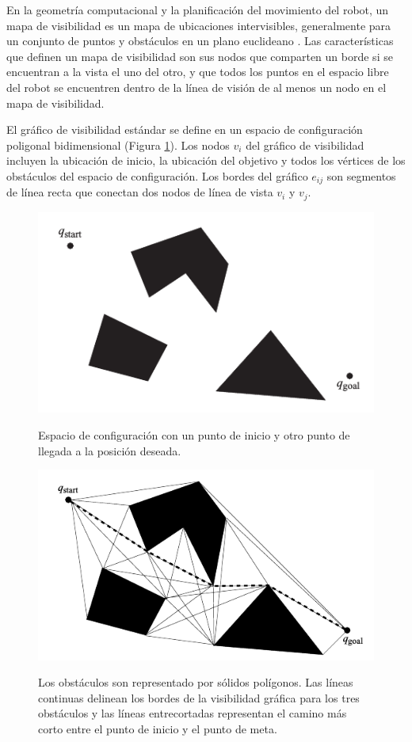 En la geometr\'ia computacional y la planificaci\'on del movimiento del robot, un mapa de visibilidad es un mapa de ubicaciones intervisibles, generalmente para un conjunto de puntos y obst\'aculos en un plano euclideano \cite{wikiVisibilityGraph}. Las caracter\'isticas que definen un mapa de visibilidad son sus nodos que comparten un borde si se encuentran a la vista el uno del otro, y que todos los puntos en el espacio libre del robot se encuentren dentro de la l\'inea de visi\'on de al menos un nodo en el mapa de visibilidad. 

El gr\'afico de visibilidad est\'andar se define en un espacio de configuraci\'on poligonal bidimensional (Figura \ref{f:mapPolygonal}). Los nodos $v_{i}$ del gr\'afico de visibilidad incluyen la ubicaci\'on de inicio, la ubicaci\'on del objetivo y todos los v\'ertices de los obst\'aculos del espacio de configuraci\'on. Los bordes del gr\'afico $e_{ij}$ son segmentos de l\'inea recta que conectan dos nodos de l\'inea de vista $v_{i}$ y $v_{j}$.

\begin{figure}%
\centering \footnotesize
 {\includegraphics[width=0.60\linewidth]{images/map_polygonal.png}}
 \captionsetup{font=footnotesize}
 \caption{Espacio de configuraci\'on con un punto de inicio y otro punto de llegada a la posici\'on deseada.}
\label{f:mapPolygonal}
\end{figure}

\begin{figure}%
\centering \footnotesize
 {\includegraphics[width=0.60\linewidth]{images/shortPath_visibilityGraph.png}}
 \captionsetup{font=footnotesize}
 \caption{Los obst\'aculos son representado por s\'olidos pol\'igonos. Las l\'ineas continuas delinean los bordes de la visibilidad gr\'afica para los tres obst\'aculos y las l\'ineas entrecortadas representan el camino m\'as corto entre el punto de inicio y el punto de meta.}
\label{f:shortVG}
\end{figure}

